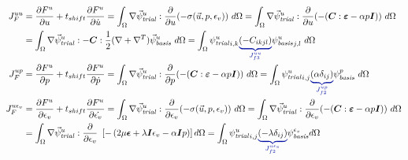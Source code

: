 \begin{align}
  J_F^{uu}                       & = \frac{\partial F^u}{\partial u} + t_{shift} \frac{\partial F^u}{\partial \dot{u}} = \int_{\Omega} \nabla \trialvec[u] : \frac{\partial}{\partial u} (- \sigma(\vec{u},p,\epsilon_{v})) \
  d\Omega = \int_{\Omega} \nabla \trialvec[u] : \frac{\partial}{\partial u} (-(\tensor{C}:\tensor{\varepsilon} -\alpha p \tensor{I})) \ d\Omega                                                                                                               \\
                                 & = \int_{\Omega} \nabla \trialvec[u] : -\tensor{C}: \frac{1}{2} (\nabla + \nabla^T) \basisvec[u] \ d\Omega = \int_{\Omega} \trialscalar[u]_{i,k}
  \eqnannotate{\left(-C_{ikjl}\right)}{J_{f3}^{uu}} \basisscalar[u]_{j,l} \ d\Omega                                                                                                                                                                           \\
  J_F^{up}                       & = \frac{\partial F^u}{\partial p} + t_{shift} \frac{\partial F^u}{\partial \dot{p}} = \int_{\Omega} \nabla \trialvec[u] : \frac{\partial}{\partial p}(-(\tensor{C}:\tensor{\varepsilon} -\alpha p \tensor{I})) \ d\Omega =
  \int_{\Omega} \trialscalar[u]_{i,j} \eqnannotate{\left(\alpha \delta_{ij}\right)}{J_{f2}^{up}} \basisscalar[p] \ d\Omega                                                                                                                                    \\
  J_F^{u \epsilon_{v}}           & = \frac{\partial F^u}{\partial \epsilon_{v}} + t_{shift} \frac{\partial F^u}{\partial \dot{\epsilon_{v}}} = \int_{\Omega} \nabla \trialvec[u] : \frac{\partial}{\partial \epsilon_{v}}
  (-\sigma(\vec{u},p,\epsilon_{v})) \ d\Omega = \int_{\Omega} \nabla \trialvec[u] :
  \frac{\partial}{\partial \epsilon_{v}} (-(\tensor{C}:\tensor{\varepsilon} -\alpha p \tensor{I})) \ d\Omega                                                                                                                                                  \\
                                 & = \int_{\Omega} \nabla \trialvec[u] : \frac{\partial}{\partial \epsilon_{v}} \
  \left[-\left(2 \mu \tensor{\epsilon} + \lambda \tensor{I} \epsilon_{v} - \alpha \tensor{I} p \right) \right] d\Omega =
  \int_{\Omega} \trialscalar[u]_{i,j} \eqnannotate{\left(-\lambda \delta_{ij} \right)}{J_{f2}^{u \epsilon_{v}}} \basisscalar[\epsilon_{v}] d\Omega                                                                                                            \\

\end{align}
